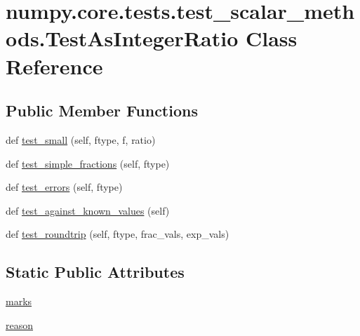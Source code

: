\hypertarget{classnumpy_1_1core_1_1tests_1_1test__scalar__methods_1_1TestAsIntegerRatio}{}\section{numpy.\+core.\+tests.\+test\+\_\+scalar\+\_\+methods.\+Test\+As\+Integer\+Ratio Class Reference}
\label{classnumpy_1_1core_1_1tests_1_1test__scalar__methods_1_1TestAsIntegerRatio}
\subsection*{Public Member Functions}
\begin{DoxyCompactItemize}
\item 
def \hyperlink{classnumpy_1_1core_1_1tests_1_1test__scalar__methods_1_1TestAsIntegerRatio_ad8eecaa121714d4b0019b43b0dfd2ebc}{test\+\_\+small} (self, ftype, f, ratio)
\item 
def \hyperlink{classnumpy_1_1core_1_1tests_1_1test__scalar__methods_1_1TestAsIntegerRatio_a416c4ef0844e83861887f2981a9bf26c}{test\+\_\+simple\+\_\+fractions} (self, ftype)
\item 
def \hyperlink{classnumpy_1_1core_1_1tests_1_1test__scalar__methods_1_1TestAsIntegerRatio_ace2e274f7486ad0441121daad26a30c8}{test\+\_\+errors} (self, ftype)
\item 
def \hyperlink{classnumpy_1_1core_1_1tests_1_1test__scalar__methods_1_1TestAsIntegerRatio_afffc5c14f0f49f3103dc5d80e281cf56}{test\+\_\+against\+\_\+known\+\_\+values} (self)
\item 
def \hyperlink{classnumpy_1_1core_1_1tests_1_1test__scalar__methods_1_1TestAsIntegerRatio_a1bf911bb5424d41dffddcb3176707ab4}{test\+\_\+roundtrip} (self, ftype, frac\+\_\+vals, exp\+\_\+vals)
\end{DoxyCompactItemize}
\subsection*{Static Public Attributes}
\begin{DoxyCompactItemize}
\item 
\hyperlink{classnumpy_1_1core_1_1tests_1_1test__scalar__methods_1_1TestAsIntegerRatio_a94cbb1f9e3262928e2473b2d9dec13b9}{marks}
\item 
\hyperlink{classnumpy_1_1core_1_1tests_1_1test__scalar__methods_1_1TestAsIntegerRatio_a37add80322df750b154e3850397e9080}{reason}
\end{DoxyCompactItemize}


